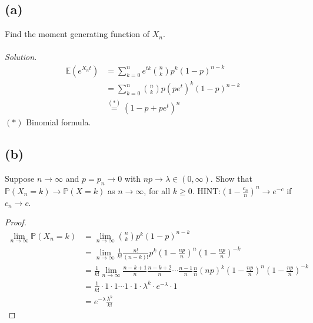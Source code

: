\documentclass{article}
\newcommand{\prob}{\mathbb{P}}
\newcommand{\E}{\mathbb{E}}
\begin{document}
\subsection*{(a)}
Find the moment generating function of $X_n$.
\color{blue}
\\\\\textit{Solution. }
\begin{equation*}
    \begin{split}
        \E(e^{X_nt}) &= \sum_{k=0}^n e^{tk}{n \choose k} p^k(1-p)^{n-k}\\
        &= \sum_{k=0}^n{n \choose k}p(pe^t)^k(1-p)^{n-k}\\
        &\stackrel{(*)}{=} (1-p+pe^t)^n
    \end{split}
\end{equation*}
$(*)$ Binomial formula.
\color{black}
\subsection*{(b)}
Suppose $n \rightarrow \infty$ and $p=p_n \rightarrow 0$ with $np \rightarrow \lambda \in (0,\infty)$. Show that $\prob(X_n=k) \rightarrow \prob(X=k) $ as $n\rightarrow \infty $, for all $k\geq 0$. HINT:$(1-\frac{c_n}{n})^n \rightarrow e^{-c} $ if $c_n \rightarrow c$.
\color{blue}
\begin{proof}
\begin{equation*}
    \begin{split}
        \lim_{n\rightarrow \infty}\prob(X_n = k)&=\lim_{n\rightarrow \infty}{n \choose k} p^k(1-p)^{n-k}\\
        &= \lim_{n\rightarrow \infty}\frac{1}{k!}\frac{n!}{(n-k)!}p^k(1-\frac{np}{n})^n(1-\frac{np}{n})^{-k}\\
        &= \frac{1}{k!}\lim_{n\rightarrow \infty}\frac{n-k+1}{n}\frac{n-k+2}{n}\cdots \frac{n-1}{n}\frac{n}{n}(np)^k(1-\frac{np}{n})^n(1- \frac{np}{n})^{-k}\\
        &= \frac{1}{k!}\cdot 1 \cdot 1 \cdots 1\cdot 1\cdot \lambda^k \cdot e^{-\lambda}\cdot 1\\
        &= e^{-\lambda}\frac{\lambda^k}{k!}
    \end{split}
\end{equation*}

\end{proof}
\color{black}
\end{document}
